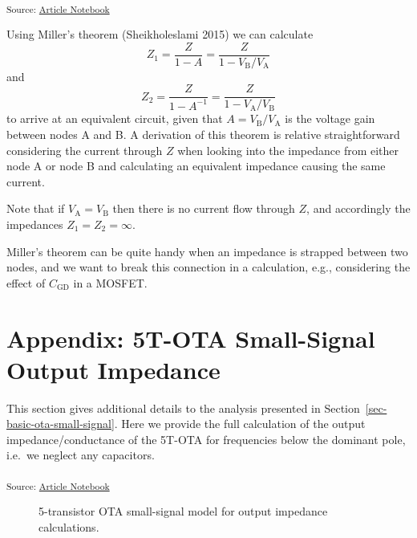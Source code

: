 \documentclass[
  a4paper,
  DIV=11,
  numbers=noendperiod]{scrartcl}
\begin{document}
\textsubscript{Source:
\href{https://iic-jku.github.io/analog-circuit-design/index.qmd.html}{Article
Notebook}}

Using Miller's theorem (Sheikholeslami 2015) we can calculate \[
Z_1 = \frac{Z}{1 - A} = \frac{Z}{1 - V_\mathrm{B} / V_\mathrm{A}} 
\] and \[
Z_2 = \frac{Z}{1 - A^{-1}} = \frac{Z}{1 - V_\mathrm{A} / V_\mathrm{B}} 
\] to arrive at an equivalent circuit, given that
\(A = V_\mathrm{B} / V_\mathrm{A}\) is the voltage gain between nodes A
and B. A derivation of this theorem is relative straightforward
considering the current through \(Z\) when looking into the impedance
from either node A or node B and calculating an equivalent impedance
causing the same current.

Note that if \(V_\mathrm{A} = V_\mathrm{B}\) then there is no current
flow through \(Z\), and accordingly the impedances
\(Z_1 = Z_2 = \infty\).

Miller's theorem can be quite handy when an impedance is strapped
between two nodes, and we want to break this connection in a
calculation, e.g., considering the effect of \(C_\mathrm{GD}\) in a
MOSFET.

\section{Appendix: 5T-OTA Small-Signal Output
Impedance}\label{sec-5t-ota-zout}

This section gives additional details to the analysis presented in
Section~\ref{sec-basic-ota-small-signal}. Here we provide the full
calculation of the output impedance/conductance of the 5T-OTA for
frequencies below the dominant pole, i.e.~we neglect any capacitors.

\textsubscript{Source:
\href{https://iic-jku.github.io/analog-circuit-design/index.qmd.html}{Article
Notebook}}

\begin{figure}[H]


\caption{\label{fig-basic-ota-small-signal-zout}5-transistor OTA
small-signal model for output impedance calculations.}

\end{figure}%
\end{document}
